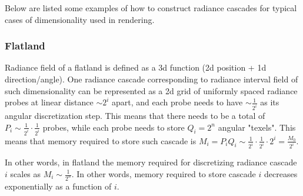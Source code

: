 \documentclass{jcgt}
\begin{document}
Below are listed some examples of how to construct radiance cascades for typical cases of dimensionality used in rendering.


\subsubsection{Flatland}
\label{sub:flatland_scaling}
Radiance field of a flatland is defined as a 3d function (2d position + 1d direction/angle). One radiance cascade corresponding to radiance interval field of such dimensionality can be represented as a 2d grid of uniformly spaced radiance probes at linear distance $\sim2^i$ apart, and each probe needs to have $\sim\frac{1}{2^i}$ as its angular discretization step. This means that there 
needs to be a total of $P_i\sim \frac{1}{2^i}\cdot\frac{1}{2^i}$ probes, while each probe needs to store $Q_i=2^n$ angular "texels". This means that memory required to store such cascade is $M_i=P_iQ_i \sim \frac{1}{2^i}\cdot\frac{1}{2^i}\cdot 2^i = \frac{M_0}{2^i}$.

In other words, in flatland the memory required for discretizing radiance cascade $i$ scales as $M_i\sim\frac{1}{2^n}$. In other words, memory required to store cascade $i$ decreases exponentially as a function of $i$.
\end{document}
